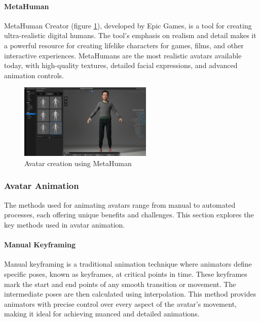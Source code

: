 \documentclass[../../main.tex]{subfiles}
\begin{document}
\paragraph{MetaHuman}
\label{par:metahuman}

MetaHuman Creator (figure \ref{fig:metahuman_example}), developed by Epic Games, is a tool for creating ultra-realistic digital humans. The tool's emphasis on realism and detail makes it a powerful resource for creating lifelike characters for games, films, and other interactive experiences. MetaHumans are the most realistic avatars available today, with high-quality textures, detailed facial expressions, and advanced animation controls.

\begin{figure} 
  \centering \includegraphics[width = 2.5in]{chapters/background_work/images/metahuman_example.png} 
  \caption{Avatar creation using MetaHuman} 
  \label{fig:metahuman_example}
\end{figure}

\subsubsection{Avatar Animation}
\label{subsubsec:avatar_animation}

The methods used for animating avatars range from manual to automated processes, each offering unique benefits and challenges. This section explores the key methods used in avatar animation.

\paragraph{Manual Keyframing}
\label{par:manual_keyframing}

Manual keyframing is a traditional animation technique where animators define specific poses, known as keyframes, at critical points in time. These keyframes mark the start and end points of any smooth transition or movement. The intermediate poses are then calculated using interpolation. This method provides animators with precise control over every aspect of the avatar’s movement, making it ideal for achieving nuanced and detailed animations.
\end{document}
